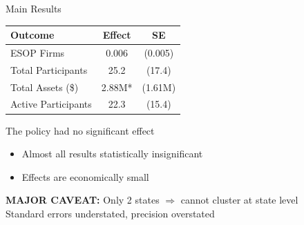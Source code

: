 \documentclass{beamer}
\begin{document}
\begin{frame}{Main Results}

\begin{table}
\centering
\begin{tabular}{lcc}
\toprule
\textbf{Outcome} & \textbf{Effect} & \textbf{SE} \\
\midrule
ESOP Firms & 0.006 & (0.005) \\
Total Participants & 25.2 & (17.4) \\
Total Assets (\$) & 2.88M* & (1.61M) \\
Active Participants & 22.3 & (15.4) \\
\bottomrule
\end{tabular}
\end{table}

\vspace{1em}
\LARGE

\alert{The policy had no significant effect}

\vspace{.5em}
\large
\begin{itemize}
    \item Almost all results statistically insignificant
    \item Effects are economically small
\end{itemize}

\vspace{.5em}

\normalsize
\textbf{\alert{MAJOR CAVEAT:}} Only 2 states $\Rightarrow$ cannot cluster at state level \\
Standard errors \alert{ understated}, precision \alert{overstated}

\end{frame}
\end{document}
